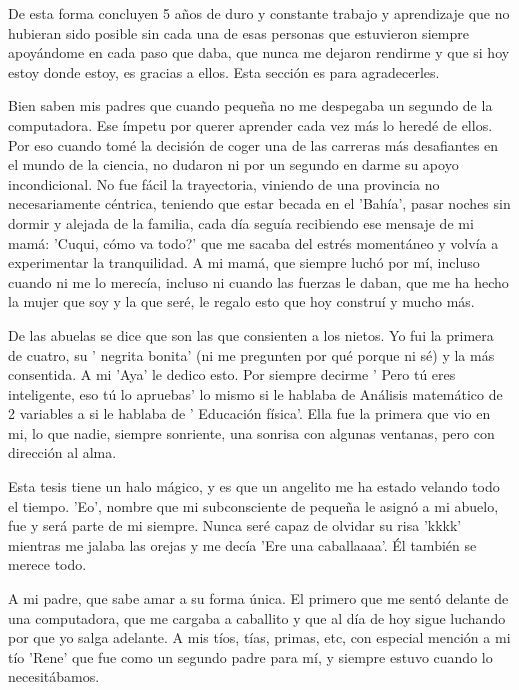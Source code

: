 \begin{acknowledgements}
    De esta forma concluyen 5 años de duro y constante trabajo y aprendizaje que no hubieran sido posible sin cada una de esas personas que estuvieron siempre apoyándome en cada paso que daba, que nunca me dejaron rendirme y que si hoy estoy donde estoy, es gracias a ellos. Esta sección es para agradecerles.

    Bien saben mis padres que cuando pequeña no me despegaba un segundo de la computadora. Ese ímpetu por querer aprender cada vez más lo heredé de ellos. Por eso cuando tomé la decisión de coger una de las carreras más desafiantes en el mundo de la ciencia, no dudaron ni por un segundo en darme su apoyo incondicional. No fue fácil la trayectoria, viniendo de una provincia no necesariamente céntrica, teniendo que estar becada en el 'Bahía', pasar noches sin dormir y alejada de la familia, cada día seguía recibiendo ese mensaje de mi mamá: 'Cuqui, cómo va todo?' que me sacaba del estrés momentáneo y volvía a experimentar la tranquilidad. A mi mamá, que siempre luchó por mí, incluso cuando ni me lo merecía, incluso ni cuando las fuerzas le daban, que me ha hecho la mujer que soy y la que seré, le regalo esto que hoy construí y mucho más.

    De las abuelas se dice que son las que consienten a los nietos. Yo fui la primera de cuatro, su ' negrita bonita' (ni me pregunten por qué porque ni sé) y la más consentida. A mi 'Aya' le dedico esto. Por siempre decirme ' Pero tú eres inteligente, eso tú lo apruebas' lo mismo si le hablaba de Análisis matemático de 2 variables a si le hablaba de ' Educación física'. Ella fue la primera que vio en mi, lo que nadie, siempre sonriente, una sonrisa con algunas ventanas, pero con dirección al alma.
    
    Esta tesis tiene un halo mágico, y es que un angelito me ha estado velando todo el tiempo. 'Eo', nombre que mi subconsciente de pequeña le asignó a mi abuelo, fue y será parte de mi siempre. Nunca seré capaz de olvidar su risa 'kkkk' mientras me jalaba las orejas y me decía 'Ere una caballaaaa'. Él también se merece todo.

    A mi padre, que sabe amar a su forma única. El primero que me sentó delante de una computadora, que me cargaba a caballito y que al día de hoy sigue luchando por que yo salga adelante. A mis tíos, tías, primas, etc, con especial mención a mi tío 'Rene' que fue como un segundo padre para mí, y siempre estuvo cuando lo necesitábamos.


\end{acknowledgements}
